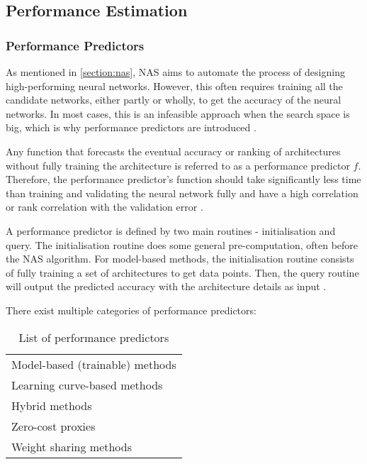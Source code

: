 \subsection{Performance Estimation}
\subsubsection{Performance Predictors}\label{sec:performancepredictors}
As mentioned in \cref{section:nas}, \gls{NAS} aims to automate the process of designing high-performing neural networks. However, this often requires training all the candidate networks, either partly or wholly, to get the accuracy of the neural networks. In most cases, this is an infeasible approach when the search space is big, which is why performance predictors are introduced \autocite{akhauri2022evolving}. 

Any function that forecasts the eventual accuracy or ranking of architectures without fully training the architecture is referred to as a performance predictor $f$. Therefore, the performance predictor's function should take significantly less time than training and validating the neural network fully and have a high correlation or rank correlation with the validation error \autocite{white2021powerful}. 

A performance predictor is defined by two main routines - initialisation and query. The initialisation routine does some general pre-computation, often before the \gls{NAS} algorithm. For model-based methods, the initialisation routine consists of fully training a set of architectures to get data points. Then, the query routine will output the predicted accuracy with the architecture details as input \autocite{white2021powerful}. 

There exist multiple categories of performance predictors:

\begin{table}[h]
\caption{List of performance predictors}
\centering
\begin{tabular}{|l}
Model-based (trainable) methods \\
\cellcolor{verylightgray}Learning curve-based methods    \\
Hybrid methods                  \\
\cellcolor{verylightgray}Zero-cost proxies               \\
Weight sharing methods         
\end{tabular}
\end{table}

